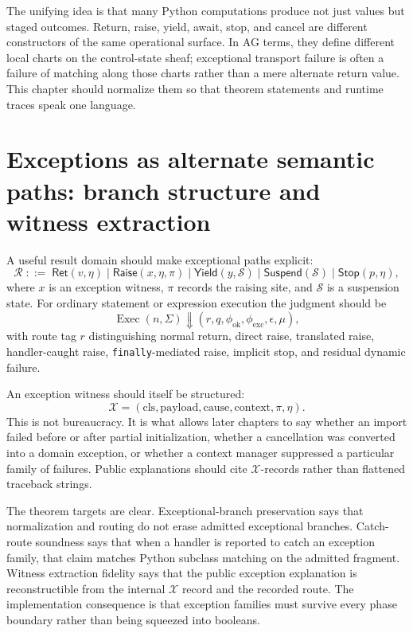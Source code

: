 \documentclass[11pt]{report}
\begin{document}
The unifying idea is that many Python computations produce not just values but staged outcomes. Return, raise, yield, await, stop, and cancel are different constructors of the same operational surface. In AG terms, they define different local charts on the control-state sheaf; exceptional transport failure is often a failure of matching along those charts rather than a mere alternate return value. This chapter should normalize them so that theorem statements and runtime traces speak one language.
\section{Exceptions as alternate semantic paths: branch structure and witness extraction}
A useful result domain should make exceptional paths explicit:
\[
\mathcal{R} \;::=\; \mathsf{Ret}(v,\eta)\mid \mathsf{Raise}(x,\eta,\pi)\mid \mathsf{Yield}(y,\mathcal{S})\mid \mathsf{Suspend}(\mathcal{S})\mid \mathsf{Stop}(p,\eta),
\]
where $x$ is an exception witness, $\pi$ records the raising site, and $\mathcal{S}$ is a suspension state. For ordinary statement or expression execution the judgment should be
\[
\operatorname{Exec}(n,\Sigma) \Downarrow (r,q,\phi_{\mathrm{ok}},\phi_{\mathrm{exc}},\epsilon,\mu),
\]
with route tag $r$ distinguishing normal return, direct raise, translated raise, handler-caught raise, \texttt{finally}-mediated raise, implicit stop, and residual dynamic failure.

An exception witness should itself be structured:
\[
\mathcal{X} = (\mathrm{cls},\mathrm{payload},\mathrm{cause},\mathrm{context},\pi,\eta).
\]
This is not bureaucracy. It is what allows later chapters to say whether an import failed before or after partial initialization, whether a cancellation was converted into a domain exception, or whether a context manager suppressed a particular family of failures. Public explanations should cite $\mathcal{X}$-records rather than flattened traceback strings.

The theorem targets are clear. Exceptional-branch preservation says that normalization and routing do not erase admitted exceptional branches. Catch-route soundness says that when a handler is reported to catch an exception family, that claim matches Python subclass matching on the admitted fragment. Witness extraction fidelity says that the public exception explanation is reconstructible from the internal $\mathcal{X}$ record and the recorded route. The implementation consequence is that exception families must survive every phase boundary rather than being squeezed into booleans.
\end{document}
